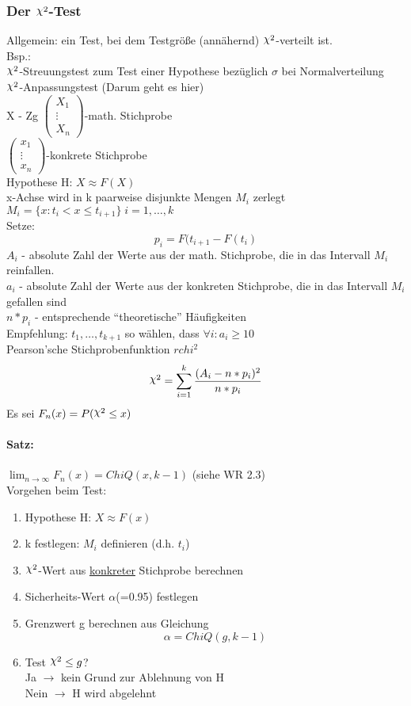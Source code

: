 \documentclass[a4paper,12pt]{scrartcl}
\DeclareRobustCommand{\rchi}{{\mathpalette\irchi\relax}}
\newcommand{\irchi}[2]{\raisebox{\depth}{$#1\chi$}}
\begin{document}
 \subsubsection{Der $\rchi^2$-Test}
  Allgemein: ein Test, bei dem Testgröße (annähernd) $\rchi^2$-verteilt ist.\\
  Bsp.:\\
  $\rchi^2$-Streuungstest zum Test einer Hypothese bezüglich $\sigma$ bei Normalverteilung\\
  $\rchi^2$-Anpassungstest (Darum geht es hier)\\
  X - Zg $\begin{pmatrix}X_1\\\vdots\\X_n\end{pmatrix}$-math. Stichprobe\\
  $\begin{pmatrix}x_1\\\vdots\\x_n\end{pmatrix}$-konkrete Stichprobe\\
  Hypothese H: $X\approx F(X)$\\
  x-Achse wird in k paarweise disjunkte Mengen $M_i$ zerlegt\\
  $M_i=\{x:t_i<x\leq t_{i+1}\}\;i=1,\dots,k$\\
  Setze:
  $$p_i=F(t_{i+1}-F(t_i)$$
  $A_i$ - absolute Zahl der Werte aus der math. Stichprobe, die in das Intervall $M_i$ reinfallen.\\
  $a_i$ - absolute Zahl der Werte aus der konkreten Stichprobe, die in das Intervall $M_i$ gefallen sind\\
  $n*p_i$ - entsprechende "`theoretische"' Häufigkeiten\\
  Empfehlung: $t_1,\dots,t_{k+1}$ so wählen, dass $\forall i: a_i\geq 10$\\
  Pearson'sche Stichprobenfunktion $rchi^2$
  $$\rchi^2 = \sum_{i=1}^k\frac{(A_i-n*p_i)^2}{n*p_i}$$
  Es sei $F_n(x)= P(\rchi^2\leq x)$\\
  \paragraph{Satz:} $\lim_{n\to\infty}F_n(x) = ChiQ(x,k-1)$ (siehe WR 2.3)\\
  Vorgehen beim Test:
  \begin{enumerate}
   \item Hypothese H: $X\approx F(x)$
   \item k festlegen: $M_i$ definieren (d.h. $t_i$)
   \item $\rchi^2$-Wert aus \underline{konkreter} Stichprobe berechnen
   \item Sicherheits-Wert $\alpha$(=0.95) festlegen
   \item Grenzwert g berechnen aus Gleichung
   $$\alpha = ChiQ(g,k-1) $$
   \item Test $\rchi^2\leq g$?\\
   Ja $\to$ kein Grund zur Ablehnung von H\\
   Nein $\to$ H wird abgelehnt
  \end{enumerate}
\end{document}
